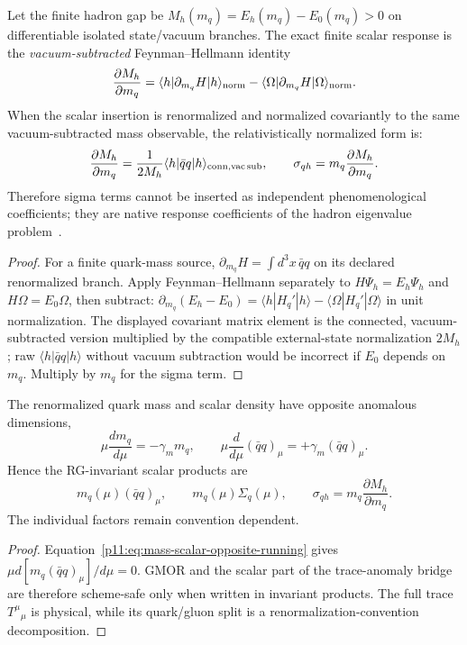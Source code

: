 \documentclass[12pt,a4paper]{article}
\begin{document}
\begin{theorem}
\label{p11:thm:native-scalar-response-bridge}
Let the finite hadron gap be \(M_h(m_q)=E_h(m_q)-E_0(m_q)>0\) on differentiable isolated state/vacuum branches. The exact finite scalar response is the \emph{vacuum-subtracted} Feynman--Hellmann identity
\[
\frac{\partial M_h}{\partial m_q}
=\langle h|\partial_{m_q}H|h\rangle_{\rm norm}
-\langle\Omega|\partial_{m_q}H|\Omega\rangle_{\rm norm}.
\]
When the scalar insertion is renormalized and normalized covariantly to the same vacuum-subtracted mass observable, the relativistically normalized form is:
\begin{equation}
\label{p11:eq:feynman-hellmann-scalar-bridge}
\frac{\partial M_h}{\partial m_q}=\frac1{2M_h}\langle h|\bar q q|h\rangle_{\rm conn,vac\,sub},
\qquad
\sigma_{qh}=m_q\frac{\partial M_h}{\partial m_q}.
\end{equation}
Therefore sigma terms cannot be inserted as independent phenomenological coefficients; they are native response coefficients of the hadron eigenvalue problem~\cite{Feynman1939,Hellmann1937}.
\end{theorem}
\begin{proof}
For a finite quark-mass source, \(\partial_{m_q}H=\int d^3x\,\bar q q\) on its declared renormalized branch. Apply Feynman--Hellmann separately to \(H\Psi_h=E_h\Psi_h\) and \(H\Omega=E_0\Omega\), then subtract: \(\partial_{m_q}(E_h-E_0)=\langle h|H_q'|h\rangle-\langle\Omega|H_q'|\Omega\rangle\) in unit normalization. The displayed covariant matrix element is the connected, vacuum-subtracted version multiplied by the compatible external-state normalization \(2M_h\); raw \(\langle h|\bar q q|h\rangle\) without vacuum subtraction would be incorrect if \(E_0\) depends on \(m_q\). Multiply by \(m_q\) for the sigma term.\qedhere
\end{proof}


\begin{theorem}
\label{p11:thm:rg-invariant-scalar-bridge}
The renormalized quark mass and scalar density have opposite anomalous
dimensions,
\begin{equation}
\label{p11:eq:mass-scalar-opposite-running}
\mu\frac{d m_q}{d\mu}=-\gamma_m m_q,
\qquad
\mu\frac{d}{d\mu}(\bar q q)_\mu=+\gamma_m(\bar q q)_\mu.
\end{equation}
Hence the RG-invariant scalar products are
\[
  m_q(\mu)(\bar q q)_\mu,\qquad
  m_q(\mu)\Sigma_q(\mu),\qquad
  \sigma_{qh}=m_q\frac{\partial M_h}{\partial m_q}.
\]
The individual factors remain convention dependent.
\end{theorem}
\begin{proof}
Equation~\eqref{p11:eq:mass-scalar-opposite-running} gives \(\mu d[m_q(\bar q q)_\mu]/d\mu=0\). GMOR and the scalar part of the trace-anomaly bridge are therefore scheme-safe only when written in invariant products. The full trace \(T^\mu{}_{\mu}\) is physical, while its quark/gluon split is a renormalization-convention decomposition.
\end{proof}
\end{document}

